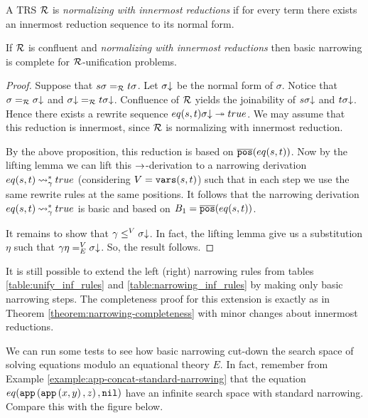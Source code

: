 \begin{definition}
	A TRS $\mathcal{R}$ is \textit{normalizing with innermost reductions} if for every term there exists an innermost reduction sequence to its normal form.
\end{definition}

\begin{theorem}
	If $\mathcal{R}$ is confluent and \textit{normalizing with innermost reductions} then basic narrowing is complete for $\mathcal{R}$-unification problems.
	\begin{proof}
		Suppose that $s\sigma \eqUnif{\trs} t\sigma$. Let $\sigma\mathord{\downarrow}$ be the normal form of $\sigma$. Notice that $\sigma \eqUnif{\trs} \trsNF{\sigma}$ and $\trsNF{\sigma} \eqUnif{\trs} t\trsNF{\sigma}$. Confluence of $\mathcal{R}$ yields the joinability of $s\sigma\mathord{\downarrow}$ and $t \sigma\mathord{\downarrow}$. Hence there exists a rewrite sequence $eq(s,t)\sigma\mathord{\downarrow} \twoheadrightarrow true$. We may assume that this reduction is innermost, since $\mathcal{R}$ is normalizing with innermost reduction.

		By the above proposition, this reduction is based on $\overline{\mathtt{pos}}(eq(s,t))$. Now by the lifting lemma we can lift this $\rightarrow$-derivation to a narrowing derivation $eq(s,t) \mathbin{\rightsquigarrow}_{\gamma}^{*} true$ (considering $V = \mathtt{vars}(s,t)$) such that in each step we use the same rewrite rules at the same positions. It follows that the narrowing derivation $eq(s,t) \mathbin{\rightsquigarrow}_\gamma^* true$ is basic and based on $B_1 = \overline{\mathtt{pos}}(eq(s,t))$.

		It remains to show that $\gamma \leq^V \sigma\mathord{\downarrow}$. In fact, the lifting lemma give us a substitution $\eta$ such that $\gamma \eta \eqUnif{E}^V \trsNF{\sigma}$. So, the result follows.
	\end{proof}
\end{theorem}

\begin{remark}
	It is still possible to extend the left (right) narrowing rules from tables \ref{table:unify_inf_rules} and \ref{table:narrowing_inf_rules} by making only basic narrowing steps. The completeness proof for this extension is exactly as in Theorem \ref{theorem:narrowing-completeness} with minor changes about innermost reductions.
\end{remark}

We can run some tests to see how basic narrowing cut-down the search space of solving equations modulo an equational theory $E$. In fact, remember from Example \ref{example:app-concat-standard-narrowing} that the equation $eq(\mathtt{app}\left(\mathtt{app}\left(x,y\right),z\right), \mathtt{nil})$ have an infinite search space with standard narrowing. Compare this with the figure below.

